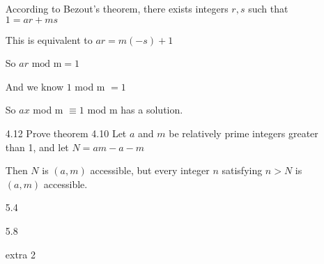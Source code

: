 \documentclass[11pt]{article}
\begin{document}
\begin{itemize}
According to Bezout’s theorem, there exists integers $r,s$ such that $1 = ar + ms$

This is equivalent to $ar = m(-s) + 1$

So $ar \text{ mod m} = 1$

And we know $1$ mod m $ = 1$

So $ax$ mod m $\equiv 1$ mod m has a solution.

\item[4.12]
Prove theorem 4.10
Let $a$ and $m$ be relatively prime integers greater than 1, and let $N = am - a - m$

Then $N$ is $(a,m)$ accessible, but every integer $n$ satisfying $n > N$ is $(a,m)$ accessible.

\item[5.4]

\item[5.8]

\item[extra 2]


\end{itemize}
\end{document}
